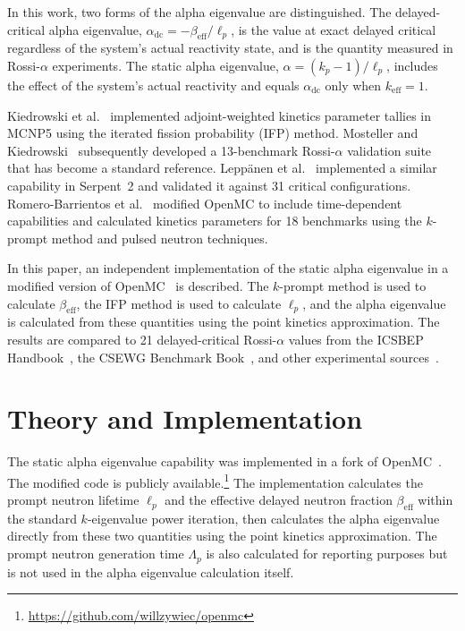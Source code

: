 \documentclass[12pt,preprint]{elsarticle}
\begin{document}
In this work, two forms of the alpha eigenvalue are distinguished. The delayed-critical alpha eigenvalue, $\alpha_{\mathrm{dc}} = -\beta_{\mathrm{eff}} / \ell_p$, is the value at exact delayed critical regardless of the system's actual reactivity state, and is the quantity measured in Rossi-$\alpha$ experiments. The static alpha eigenvalue, $\alpha = (k_p - 1) / \ell_p$, includes the effect of the system's actual reactivity and equals $\alpha_{\mathrm{dc}}$ only when $k_{\mathrm{eff}} = 1$.

Kiedrowski et al.~\cite{kiedrowski2011} implemented adjoint-weighted kinetics parameter tallies in MCNP5 using the iterated fission probability (IFP) method. Mosteller and Kiedrowski~\cite{mosteller2011} subsequently developed a 13-benchmark Rossi-$\alpha$ validation suite that has become a standard reference. Lepp\"anen et al.~\cite{leppanen2014} implemented a similar capability in Serpent~2 and validated it against 31 critical configurations. Romero-Barrientos et al.~\cite{romero2022} modified OpenMC to include time-dependent capabilities and calculated kinetics parameters for 18 benchmarks using the $k$-prompt method and pulsed neutron techniques.

In this paper, an independent implementation of the static alpha eigenvalue in a modified version of OpenMC~\cite{zywiec_openmc,romano2015} is described. The $k$-prompt method is used to calculate $\beta_{\mathrm{eff}}$, the IFP method is used to calculate $\ell_p$, and the alpha eigenvalue is calculated from these quantities using the point kinetics approximation. The results are compared to 21 delayed-critical Rossi-$\alpha$ values from the ICSBEP Handbook~\cite{icsbep}, the CSEWG Benchmark Book~\cite{csewg}, and other experimental sources~\cite{tonoike2002,takano1985}.

\section{Theory and Implementation}\label{sec:theory}

The static alpha eigenvalue capability was implemented in a fork of OpenMC~\cite{romano2015}. The modified code is publicly available.\footnote{\url{https://github.com/willzywiec/openmc}} The implementation calculates the prompt neutron lifetime $\ell_p$ and the effective delayed neutron fraction $\beta_{\mathrm{eff}}$ within the standard $k$-eigenvalue power iteration, then calculates the alpha eigenvalue directly from these two quantities using the point kinetics approximation. The prompt neutron generation time $\Lambda_p$ is also calculated for reporting purposes but is not used in the alpha eigenvalue calculation itself.
\end{document}
